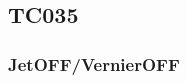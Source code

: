 \documentclass[12pt]{article}
\begin{document}
%
%

\subsection{\textbf{TC035}}\label{sec:TC035}

\subsubsection{JetOFF/VernierOFF}
\end{document}
